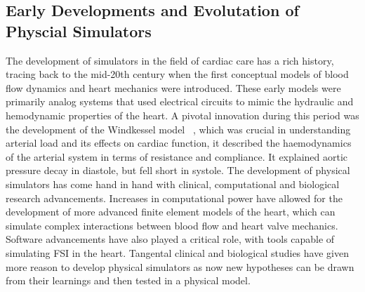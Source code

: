 \subsection{Early Developments and Evolutation of Physcial Simulators}
The development of simulators in the field of cardiac care has a rich history, tracing back to the mid-20th century when the first conceptual models of blood flow dynamics and heart mechanics were introduced. These early models were primarily analog systems that used electrical circuits to mimic the hydraulic and hemodynamic properties of the heart. A pivotal innovation during this period was the development of the Windkessel model ~, which was crucial in understanding arterial load and its effects on cardiac function, it described the haemodynamics of the arterial system in terms of resistance and compliance. It explained aortic pressure decay in diastole, but fell short in systole.
The development of physical simulators has come hand in hand with clinical, computational and biological research advancements. Increases in computational power have allowed for the development of more advanced finite element models of the heart, which can simulate complex interactions between blood flow and heart valve mechanics. Software advancements have also played a critical role, with tools capable of simulating \gls{FSI} in the heart. Tangental clinical and biological studies have given more reason to develop physical simulators as now new hypotheses can be drawn from their learnings and then tested in a physical model.

